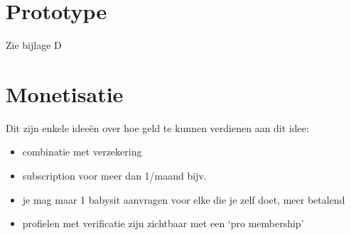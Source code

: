 \documentclass[a4paper,12pt]{article}
\begin{document}
\section{Prototype}

Zie bijlage D

\section{Monetisatie}
Dit zijn enkele idee\"en over hoe geld te kunnen verdienen aan dit idee:

\begin{itemize}
  \item combinatie met verzekering
  \item subscription voor meer dan 1/maand bijv.
  \item je mag maar 1 babysit aanvragen voor elke die je zelf doet, meer betalend
  \item profielen met verificatie zijn zichtbaar met een `pro membership'
\end{itemize}
\end{document}
